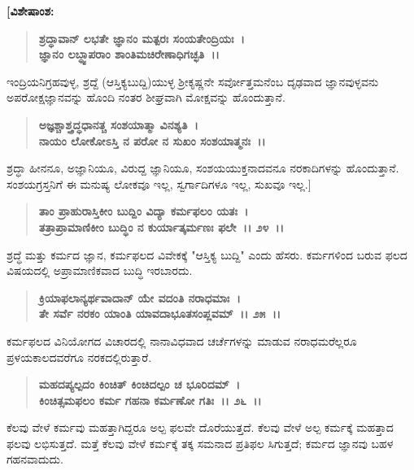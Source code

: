 \begin{flushleft}
\textbf{[ವಿಶೇಷಾಂಶ:}
\end{flushleft}

\begin{verse}
\textbf{ಶ್ರದ್ಧಾವಾನ್ ಲಭತೇ ಜ್ಞಾನಂ ಮತ್ಪರಃ ಸಂಯತೇಂದ್ರಿಯಃ~।}\\\textbf{ಜ್ಞಾನಂ ಲಬ್ಧ್ವಾಪರಾಂ ಶಾಂತಿಮಚಿರೇಣಾಧಿಗಚ್ಛತಿ~।।} 
\end{verse}

ಇಂದ್ರಿಯನಿಗ್ರಹವುಳ್ಳ, ಶ್ರದ್ದೆ (ಆಸ್ತಿಕ್ಯಬುದ್ದಿ)ಯುಳ್ಳ ಶ‍್ರೀಕೃಷ್ಣನೇ ಸರ್ವೋತ್ತಮನೆಂಬ ದೃಢವಾದ ಜ್ಞಾನವುಳ್ಳವನು ಅಪರೋಕ್ಷಜ್ಞಾನವನ್ನು ಹೊಂದಿ ನಂತರ ಶೀಘ್ರವಾಗಿ ಮೋಕ್ಷವನ್ನು ಹೊಂದುತ್ತಾನೆ.

\begin{verse}
\textbf{ಅಜ್ಞಶ್ಚಾಶ್ತ್ರದ್ಧಧಾನತ್ಚ ಸಂಶಯಾತ್ಮಾ ವಿನಶ್ಯತಿ~।}\\\textbf{ನಾಯಂ ಲೋಕೋಽಸ್ತಿ ನ ಪರೋ ನ ಸುಖಂ ಸಂಶಯಾತ್ಮನಃ~।।} 
\end{verse}

ಶ್ರದ್ಧಾ ಹೀನನೂ, ಅಜ್ಞಾನಿಯೂ, ವಿರುದ್ದ ಜ್ಞಾನಿಯೂ, ಸಂಶಯಯುಕ್ತನಾದವನೂ ನರಕಾದಿಗಳನ್ನು ಹೊಂದುತ್ತಾನೆ. ಸಂಶಯಗ್ರಸ್ತನಿಗೆ ಈ ಮನುಷ್ಯ ಲೋಕವೂ ಇಲ್ಲ, ಸ್ವರ್ಗಾದಿಗಳೂ ಇಲ್ಲ, ಸುಖವೂ ಇಲ್ಲ.]

\begin{verse}
\textbf{ತಾಂ ಪ್ರಾಹುರಾಸ್ತಿಕೀಂ ಬುದ್ದಿಂ ವಿದ್ಯಾ ಕರ್ಮಫಲಂ ಯತಃ~।}\\\textbf{ತತ್ರಾಪ್ರಾಮಾಣಿಕೀಂ ಬುದ್ಧಿಂ ನ ಕುರ್ಯಾತ್ಕರ್ಮಣಃ ಫಲೇ~।। ೨೪~।।}
\end{verse}

ಶ್ರದ್ಧೆ ಮತ್ತು ಕರ್ಮದ ಜ್ಞಾನ, ಕರ್ಮಫಲದ ವಿವೇಕಕ್ಕೆ "ಆಸ್ತಿಕ್ಯ ಬುದ್ದಿ" ಎಂದು ಹೆಸರು. ಕರ್ಮಗಳಿಂದ ಬರುವ ಫಲದ ವಿಷಯದಲ್ಲಿ ಅಪ್ರಾಮಾಣಿಕವಾದ ಬುದ್ಧಿ ಇರಬಾರದು.

\begin{verse}
\textbf{ಕ್ರಿಯಾಫಲಾನ್ಯರ್ಥವಾದಾನ್ ಯೇ ವದಂತಿ ನರಾಧಮಾಃ~।}\\\textbf{ತೇ ಸರ್ವೆ ನರಕಂ ಯಾಂತಿ ಯಾವದಾಭೂತಸಂಪ್ಲವಮ್~।। ೨೫~।।}
\end{verse}

ಕರ್ಮಫಲದ ವಿನಿಯೋಗದ ವಿಚಾರದಲ್ಲಿ ನಾನಾವಿಧವಾದ ಚರ್ಚೆಗಳನ್ನು ಮಾಡುವ ನರಾಧಮರೆಲ್ಲರೂ ಪ್ರಳಯಕಾಲದವರೆಗೂ ನರಕದಲ್ಲಿರುತ್ತಾರೆ.

\begin{verse}
\textbf{ಮಹದಪ್ಯಲ್ಪದಂ ಕಿಂಚಿತ್ ಕಿಂಚಿದಲ್ಪಂ‌ ಚ ಭೂರಿದಮ್~।}\\\textbf{ಕಿಂಚಿತ್ಸಮಫಲಂ ಕರ್ಮ ಗಹನಾ ಕರ್ಮಣೋ ಗತಿಃ~।। ೨೬~।।}
\end{verse}

ಕೆಲವು ವೇಳೆ ಕರ್ಮವು ಮಹತ್ತಾಗಿದ್ದರೂ ಅಲ್ಪ ಫಲವೇ ದೊರೆಯುತ್ತದೆ. ಕೆಲವು ವೇಳೆ ಅಲ್ಪ ಕರ್ಮಕ್ಕೆ ಮಹತ್ತಾದ ಫಲವು ಲಭಿಸುತ್ತದೆ. ಮತ್ತೆ ಕೆಲವು ವೇಳೆ ಕರ್ಮಕ್ಕೆ ತಕ್ಕ ಸಮನಾದ ಪ್ರತಿಫಲ ಸಿಗುತ್ತದೆ; ಕರ್ಮದ ಜ್ಞಾನವು ಬಹಳ ಗಹನವಾದುದು.

